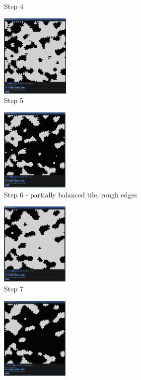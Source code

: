 \documentclass[12pt]{report}
\begin{document}
\begin{figure}[H]
\begin{subfigure}[t]{0.3\textwidth}
		\caption{Step 4} 
	\end{subfigure} \hspace{1em}
	\begin{subfigure}[t]{0.3\textwidth}
		\centering
		\includegraphics[height=4cm]{images/s_5}
		\caption{Step 5} 
	\end{subfigure} \hspace{1em}
	\begin{subfigure}[t]{0.3\textwidth}
		\centering
		\includegraphics[height=4cm]{images/s_6}
		\caption{Step 6 - partially balanced tile, rough edges} 
	\end{subfigure} \hspace{1em}
	\begin{subfigure}[t]{0.3\textwidth}
		\centering
		\includegraphics[height=4cm]{images/s_7}
		\caption{Step 7} 
	\end{subfigure} \hspace{1em}
	\begin{subfigure}[t]{0.3\textwidth}
		\centering
		\includegraphics[height=4cm]{images/s_8}

\end{subfigure}
\end{figure}
\end{document}
